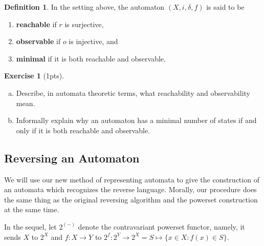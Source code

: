 \documentclass{article}
\theoremstyle{definition}
\newtheorem{defn}[thm]{Definition}
\newtheorem{exer}{Exercise}
\theoremstyle{remark}
\begin{document}
\begin{defn}
	In the setting above, the automaton $(X,i, \delta,f)$ is said to be
	\begin{enumerate}
		\item \textbf{reachable} if $r$ is surjective,
		\item \textbf{observable} if $o$ is injective, and
		\item \textbf{minimal} if it is both reachable and observable.
	\end{enumerate}
\end{defn}
\begin{exer}[1pts]
    \begin{enumerate}[(a)]
        \item Describe, in automata theoretic terms, what reachability and observability mean.
        \item Informally explain why an automaton has a minimal number of states if and only if it is both reachable and observable.
    \end{enumerate}
\end{exer}

\subsection{Reversing an Automaton}
We will use our new method of representing automata to give the construction of an automata which recognizes the reverse language. Morally, our procedure does the same thing as the original reversing algorithm and the powerset construction at the same time.

In the sequel, let $2^{(-)}$ denote the contravariant powerset functor, namely, it sends $X$ to $2^X$ and $f: X \rightarrow Y$ to $2^f: 2^Y \rightarrow 2^X = S \mapsto \{x \in X: f(x) \in S\}$.
\end{document}
